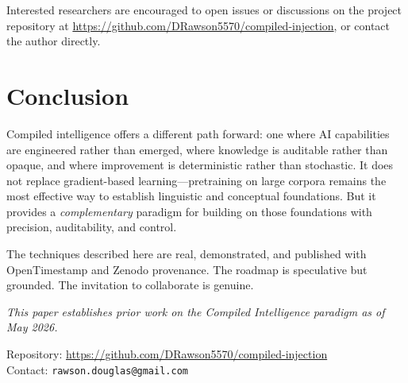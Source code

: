 \documentclass[11pt,a4paper]{article}
\begin{document}
Interested researchers are encouraged to open issues or discussions on the project repository at \url{https://github.com/DRawson5570/compiled-injection}, or contact the author directly.

\section{Conclusion}

Compiled intelligence offers a different path forward: one where AI capabilities are engineered rather than emerged, where knowledge is auditable rather than opaque, and where improvement is deterministic rather than stochastic. It does not replace gradient-based learning---pretraining on large corpora remains the most effective way to establish linguistic and conceptual foundations. But it provides a \emph{complementary} paradigm for building on those foundations with precision, auditability, and control.

The techniques described here are real, demonstrated, and published with OpenTimestamp and Zenodo provenance. The roadmap is speculative but grounded. The invitation to collaborate is genuine.

\vspace{1em}
\noindent\emph{This paper establishes prior work on the Compiled Intelligence paradigm as of May 2026.}

\vspace{0.5em}
\noindent Repository: \url{https://github.com/DRawson5570/compiled-injection}\\
Contact: \texttt{rawson.douglas@gmail.com}
\end{document}
